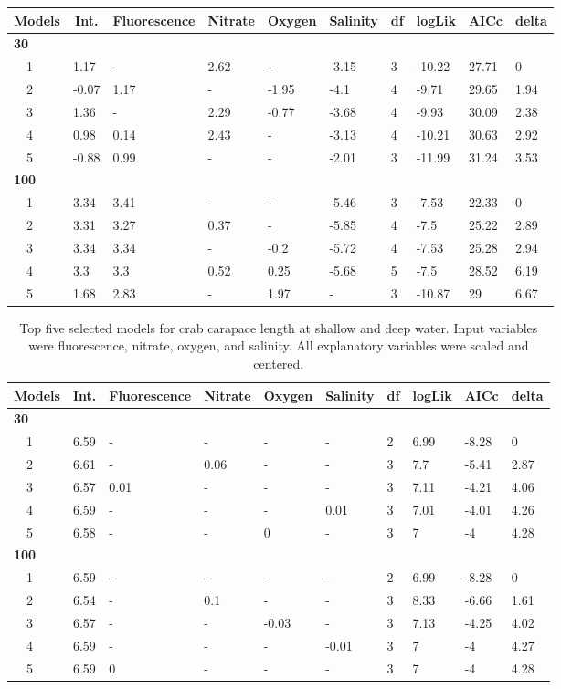 \documentclass[letterpaper,12pt]{article}\usepackage[]{graphicx}\usepackage[]{color}
\begin{document}
\begin{landscape}
\begin{table}[!tbp]
{\begin{center}
\begin{tabular}{llllllllll}
\hline\hline
\multicolumn{1}{l}{Models}&\multicolumn{1}{c}{Int.}&\multicolumn{1}{c}{Fluorescence}&\multicolumn{1}{c}{Nitrate}&\multicolumn{1}{c}{Oxygen}&\multicolumn{1}{c}{Salinity}&\multicolumn{1}{c}{df}&\multicolumn{1}{c}{logLik}&\multicolumn{1}{c}{AICc}&\multicolumn{1}{c}{delta}\tabularnewline
\hline
{\bfseries 30}&&&&&&&&&\tabularnewline
~~1&1.17&-&2.62&-&-3.15&3&-10.22&27.71&0\tabularnewline
~~2&-0.07&1.17&-&-1.95&-4.1&4&-9.71&29.65&1.94\tabularnewline
~~3&1.36&-&2.29&-0.77&-3.68&4&-9.93&30.09&2.38\tabularnewline
~~4&0.98&0.14&2.43&-&-3.13&4&-10.21&30.63&2.92\tabularnewline
~~5&-0.88&0.99&-&-&-2.01&3&-11.99&31.24&3.53\tabularnewline
\hline
{\bfseries 100}&&&&&&&&&\tabularnewline
~~1&3.34&3.41&-&-&-5.46&3&-7.53&22.33&0\tabularnewline
~~2&3.31&3.27&0.37&-&-5.85&4&-7.5&25.22&2.89\tabularnewline
~~3&3.34&3.34&-&-0.2&-5.72&4&-7.53&25.28&2.94\tabularnewline
~~4&3.3&3.3&0.52&0.25&-5.68&5&-7.5&28.52&6.19\tabularnewline
~~5&1.68&2.83&-&1.97&-&3&-10.87&29&6.67\tabularnewline
\hline
\end{tabular}\end{center}}
\end{table}

\end{landscape}

\begin{landscape}
\centering\vspace*{\fill}
\begin{table}[!tbp]
{\scriptsize
\caption{Top five selected models for crab carapace length at shallow and deep water. Input variables were fluorescence, nitrate, oxygen, and salinity.  All explanatory variables were scaled and centered.\label{tab:cltab}} 
\begin{center}
\begin{tabular}{llllllllll}
\hline\hline
\multicolumn{1}{l}{Models}&\multicolumn{1}{c}{Int.}&\multicolumn{1}{c}{Fluorescence}&\multicolumn{1}{c}{Nitrate}&\multicolumn{1}{c}{Oxygen}&\multicolumn{1}{c}{Salinity}&\multicolumn{1}{c}{df}&\multicolumn{1}{c}{logLik}&\multicolumn{1}{c}{AICc}&\multicolumn{1}{c}{delta}\tabularnewline
\hline
{\bfseries 30}&&&&&&&&&\tabularnewline
~~1&6.59&-&-&-&-&2&6.99&-8.28&0\tabularnewline
~~2&6.61&-&0.06&-&-&3&7.7&-5.41&2.87\tabularnewline
~~3&6.57&0.01&-&-&-&3&7.11&-4.21&4.06\tabularnewline
~~4&6.59&-&-&-&0.01&3&7.01&-4.01&4.26\tabularnewline
~~5&6.58&-&-&0&-&3&7&-4&4.28\tabularnewline
\hline
{\bfseries 100}&&&&&&&&&\tabularnewline
~~1&6.59&-&-&-&-&2&6.99&-8.28&0\tabularnewline
~~2&6.54&-&0.1&-&-&3&8.33&-6.66&1.61\tabularnewline
~~3&6.57&-&-&-0.03&-&3&7.13&-4.25&4.02\tabularnewline
~~4&6.59&-&-&-&-0.01&3&7&-4&4.27\tabularnewline
~~5&6.59&0&-&-&-&3&7&-4&4.28\tabularnewline
\hline
\end{tabular}\end{center}}
\end{table}

\end{landscape}
\end{document}
